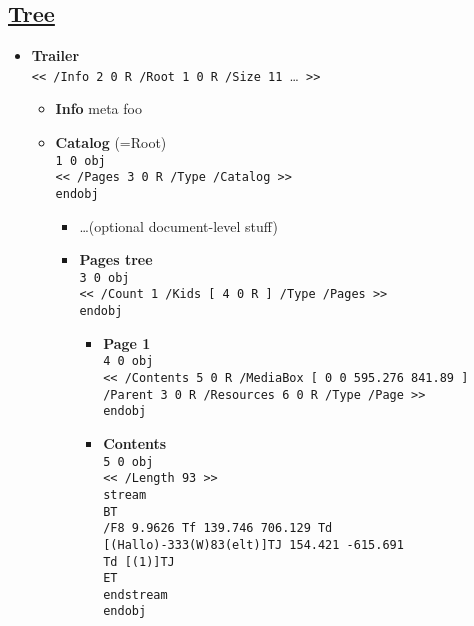 \documentclass[a4paper,10pt]{article}
\newcommand\pdfref[2]{\href{\pdfspecfile\##1}{#2}}
\begin{document}
\newpage
\subsection{\pdfref{G6.1846820}{Tree}}
\begin{itemize}
  \item \textbf{Trailer}\\
  \texttt{<< /Info 2 0 R /Root 1 0 R /Size 11 }\ldots\texttt{ >>}
  \begin{itemize}
    \item \textbf{Info} meta foo
    \item \textbf{Catalog} (=Root)\\
    \texttt{1 0 obj\\
    << /Pages 3 0 R /Type /Catalog >>\\
    endobj}
    \begin{itemize}
      \item \ldots (optional document-level stuff)
      \item \textbf{Pages tree}\\
      \texttt{3 0 obj\\
        << /Count 1 /Kids [ 4 0 R ] /Type /Pages >>\\
        endobj}
      \begin{itemize}
        \item \textbf{Page 1}\\
        \texttt{4 0 obj\\
        << /Contents 5 0 R /MediaBox [ 0 0 595.276 841.89 ] /Parent 3 0 R /Resources 6 0 R /Type /Page >>\\
        endobj}
          \item \quad\textbf{Contents}\\
          \texttt{5 0 obj\\
            << /Length 93 >>\\
            stream\\
            BT\\
            /F8 9.9626 Tf 139.746 706.129 Td [(Hallo)-333(W)83(elt)]TJ 154.421 -615.691\\ Td [(1)]TJ\\
            ET\\
            endstream\\
            endobj}

      \end{itemize}

    \end{itemize}

  \end{itemize}

\end{itemize}
\end{document}

